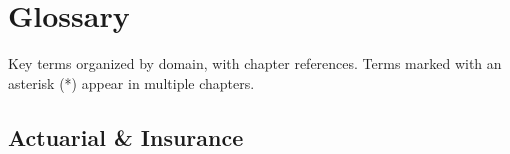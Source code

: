 
\chapter{Glossary}
\label{app:glossary}

Key terms organized by domain, with chapter references. Terms marked with an asterisk (*) appear in multiple chapters.

\section*{Actuarial \& Insurance}

